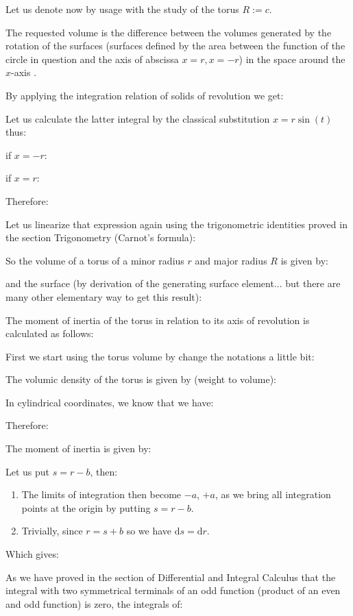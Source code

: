 {\begin{itemize}
	\end{itemize}
	Let us denote now by usage with the study of the torus $R:=c$.
	
	The requested volume is the difference between the volumes generated by the rotation of the surfaces (surfaces defined by the area between the function of the circle in question and the axis of abscissa $x=r,x=-r$) in the space around the $x$-axis .

	By applying the integration relation of solids of revolution we get:
	
	Let us calculate the latter integral by the classical substitution $x=r\sin(t)$  thus:
	
	if $x=-r$:
	
	if $x=r$:
	
	Therefore:
	
	Let us linearize that expression again using the trigonometric identities proved in the section Trigonometry (Carnot's formula):
	
	So the volume of a torus of a minor radius $r$ and major radius $R$ is given by:
	
	and the surface (by derivation of the generating surface element... but there are many other elementary way to get this result):
	
	The moment of inertia of the torus in relation to its axis of revolution is calculated as follows:

	First we start using the torus volume by change the notations a little bit:
	
	The volumic density of the torus is given by (weight to volume):
	
	In cylindrical coordinates, we know that we have:
	
	Therefore:
	
	The moment of inertia is given by:
	
	Let us put $s=r-b$, then:
	\begin{enumerate}
		\item The limits of integration then become $-a$, $+ a$, as we bring all integration points at the origin by putting $s=r-b$.

		\item Trivially, since $r=s+b$ so we have $\mathrm{d}s=\mathrm{d}r$.
	\end{enumerate}
	Which gives:
	
	As we have proved in the section of Differential and Integral Calculus that the integral with two symmetrical terminals of an odd function (product of an even and odd function) is zero, the integrals of:
	
}
